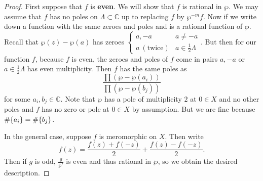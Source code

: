 \documentclass[leqno, openany]{memoir}
\theoremstyle{definition}
\theoremstyle{remark}
\theoremstyle{plain}
\theoremstyle{definition}
\theoremstyle{remark}
\newcommand{\C}{\mathbb{C}}
\begin{document}
\begin{proof}
    First suppose that $f$ is \textbf{even}. We will show that $f$ is rational in $\wp$. We may assume that $f$ has no poles on $\Lambda \subset \C$ up to replacing $f$ by $\wp^{-m} f$. Now if we write down a function with the same zeroes and poles and is a rational function of $\wp$. Recall that $\wp(z) - \wp(a)$ has zeroes $\begin{cases} a, -a & a \neq -a \\ a\ (\text{twice}) & a \in \frac{1}{2} \Lambda \end{cases}$. But then for our function $f$, because $f$ is even, the zeroes and poles of $f$ come in pairs $a, -a$ or $a \in \frac{1}{2} \Lambda$ has even multiplicity. Then $f$ has the same poles as
    \[ \frac{\prod (\wp - \wp(a_i))}{\prod (\wp - \wp(b_j))} \]
    for some $a_i, b_j \in \C$. Note that $\wp$ has a pole of multiplicity $2$ at $0 \in X$ and no other poles and $f$ has no zero or pole at $0 \in X$ by assumption. But we are fine because $\# \qty{a_i} = \# \qty{b_j}$.

    In the general case, suppose $f$ is meromorphic on $X$. Then write 
    \[ f(z) = \frac{f(z) + f(-z)}{2} + \frac{f(z) - f(-z)}{2}. \]
    Then if $g$ is odd, $\frac{g}{\wp'}$ is even and thus rational in $\wp$, so we obtain the desired description.
\end{proof}
\end{document}
